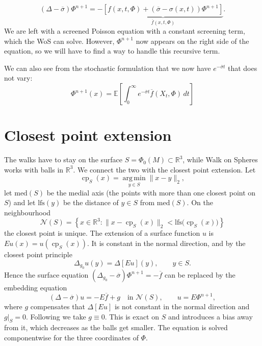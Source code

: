 \documentclass[
]{elteiktdk}[2024/04/26]
\begin{document}
	\begin{equation}
		\left(\Delta - \overline{\sigma}\right)\Phi^{n+1}  = - \underbrace{\left[f(x,t,\Phi) + \left(\overline{\sigma} - \sigma(x,t)\right)\Phi^{n+1}\right]}_{\overline{f}(x,t,\Phi)}.
	\end{equation}
	We are left with a screened Poisson equation with a constant screening term, which the WoS can solve. However, $\Phi^{n+1}$ now appears on the right side of the equation, so we will have to find a way to handle this recursive term.
	
	We can also see from the stochastic formulation that we now have $e^{-\overline{\sigma}t}$ that does not vary:
	\begin{equation}
		\Phi^{n+1}(x) = \mathbb{E}\left[\int_{0}^{\infty} e^{-\overline{\sigma}t} \overline{f}(X_t, \Phi) \, dt\right]
	\end{equation}
	
	\section{Closest point extension}
	\label{sec:method-cpm}
	
	The walks have to stay on the surface $S=\Phi_0(M)\subset\mathbb{R}^3$, while Walk on
	Spheres works with balls in $\mathbb{R}^3$. We connect the two with the closest point
	extension. Let
	\begin{equation}
		\operatorname{cp}_S(x)=\operatorname*{arg\,min}_{y\in S}\|x-y\|_2 ,
	\end{equation}
	let $\mathrm{med}(S)$ be the medial axis (the points with more than one closest point on $S$) and
	let $\mathrm{lfs}(y)$ be the distance of $y\in S$ from $\mathrm{med}(S)$. On the neighbourhood
	\begin{equation}
		\mathcal N(S)=\left\{x\in\mathbb{R}^3 : \|x-\operatorname{cp}_S(x)\|_2<\mathrm{lfs}\big(\operatorname{cp}_S(x)\big)\right\}
	\end{equation}
	the closest point is unique. The extension of a surface function $u$ is
$Eu(x)=u(\operatorname{cp}_S(x))$. It is constant in the normal direction, and by the closest point principle \cite{ruuth2008simple}
	\begin{equation}
		\Delta_{g_0}u(y)=\Delta[Eu](y),\qquad y\in S .
	\end{equation}
	Hence the surface equation $(\Delta_{g_0}-\overline\sigma)\Phi^{n+1}=-\overline f$ can be
	replaced by the embedding equation
	\begin{equation}
		\left(\Delta-\overline\sigma\right)u = -E\overline f + g \quad\text{in }\mathcal N(S),
		\qquad u=E\Phi^{n+1},
	\end{equation}
	where $g$ compensates that $\Delta[Eu]$ is not constant in the normal direction and $g|_S=0$.
	Following \textcite{Sugimoto:2024:PWoS} we take $g\equiv0$. This is exact on $S$ and
	introduces a bias away from it, which decreases as the balls get smaller.
	The equation is solved componentwise for the three coordinates of $\Phi$.
	
\end{document}
